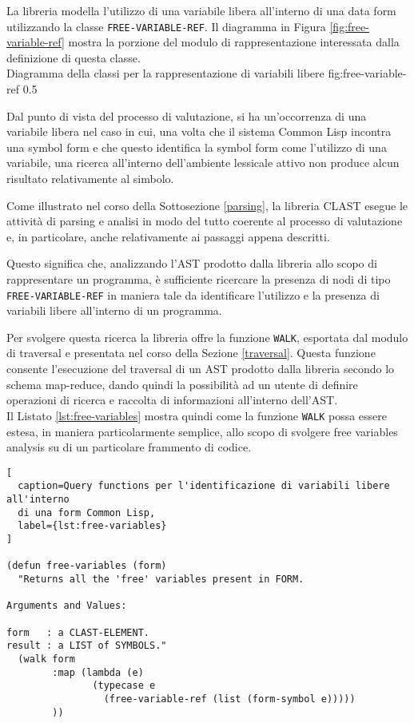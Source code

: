 La libreria modella l'utilizzo di una variabile libera all'interno di una data
form utilizzando la classe \texttt{FREE-VARIABLE-REF}. Il diagramma in Figura
\ref{fig:free-variable-ref} mostra la porzione del modulo di rappresentazione
interessata dalla definizione di questa classe.\\

      {Diagramma della classi per la rappresentazione di variabili libere}
      {fig:free-variable-ref}
      {0.5}

Dal punto di vista del processo di valutazione, si ha un'occorrenza di una
variabile libera nel caso in cui, una volta che il sistema Common Lisp incontra
una symbol form e che questo identifica la symbol form come l'utilizzo di una
variabile, una ricerca all'interno dell'ambiente lessicale attivo non produce
alcun risultato relativamente al simbolo.

Come illustrato nel corso della Sottosezione \ref{parsing}, la libreria CLAST
esegue le attività di parsing e analisi in modo del tutto coerente al processo
di valutazione e, in particolare, anche relativamente ai passaggi appena
descritti.


Questo significa che, analizzando l'AST prodotto dalla libreria allo scopo di
rappresentare un programma, è sufficiente ricercare la presenza di nodi di tipo
\texttt{FREE-VARIABLE-REF} in maniera tale da identificare l'utilizzo e la
presenza di variabili libere all'interno di un programma.

Per svolgere questa ricerca la libreria offre la funzione \texttt{WALK},
esportata dal modulo di traversal e presentata nel corso della Sezione
\ref{traversal}. Questa funzione consente l'esecuzione del traversal di un AST
prodotto dalla libreria secondo lo schema map-reduce, dando quindi la
possibilità ad un utente di definire operazioni di ricerca e raccolta di
informazioni all'interno dell'AST.\\

Il Listato \ref{lst:free-variables} mostra quindi come la funzione \texttt{WALK}
possa essere estesa, in maniera particolarmente semplice, allo scopo di svolgere
free variables analysis su di un particolare frammento di codice.

\begin{lstlisting}[
  caption=Query functions per l'identificazione di variabili libere all'interno
  di una form Common Lisp,
  label={lst:free-variables}
]

(defun free-variables (form)
  "Returns all the 'free' variables present in FORM.

Arguments and Values:

form   : a CLAST-ELEMENT.
result : a LIST of SYMBOLS."
  (walk form
        :map (lambda (e)
               (typecase e
                 (free-variable-ref (list (form-symbol e)))))
        ))

\end{lstlisting}

